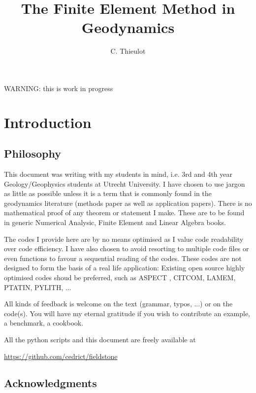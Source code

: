\documentclass[a4paper]{article}
\title{The Finite Element Method in Geodynamics}
\author{C. Thieulot}
\begin{document}
\maketitle

\tableofcontents

\newpage

\begin{center}
{\color{red} \huge WARNING: this is work in progress}
\end{center}

\section{Introduction}

\subsection{Philosophy} %
This document was writing with my students in mind, i.e. 3rd and 4th year 
Geology/Geophysics students at Utrecht University. 
I have chosen to use jargon as little as possible unless it is a term that is 
commonly found in the geodynamics literature (methods paper as well as 
application papers). There is no mathematical proof of any theorem or statement 
I make. These are to be found in generic Numerical Analysic, Finite Element and 
Linear Algebra books. 

The codes I provide here are by no means optimised as I value code readability 
over code efficiency. I have also chosen to avoid resorting to multiple code 
files or even functions to favour a sequential reading of the codes. 
These codes are not designed to form the basis of a real life application:
Existing open source highly optimised codes shoud be preferred, such as 
ASPECT \cite{krhb12,hedg17}, CITCOM, LAMEM, PTATIN, PYLITH, ... 

All kinds of feedback is welcome on the text (grammar, typos, ...) or on the 
code(s). You will have my eternal gratitude if you wish to contribute an 
example, a benchmark, a cookbook. 

All the python scripts and this document are freely available at 
\begin{center}
\url{https://github.com/cedrict/fieldstone}
\end{center}

\subsection{Acknowledgments} %
\end{document}

